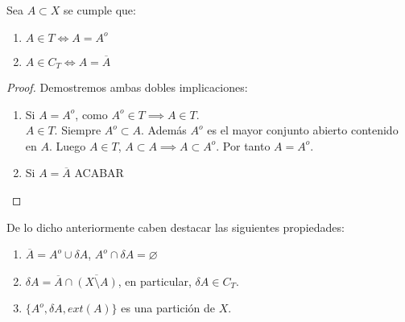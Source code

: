 \begin{ncor}
  Sea $A \subset X$ se cumple que:
  \begin{enumerate}
    \item $A \in T \Leftrightarrow A=A^o$
    \item $A \in C_T \Leftrightarrow A=\overline{A}$
  \end{enumerate}
\end{ncor}
\begin{proof}
  Demostremos ambas dobles implicaciones:
  \begin{enumerate}
    \item \fbox{$\Leftarrow$} Si $A=A^o$, como $A^o \in T \implies A \in T$. \\ \fbox{$\Rightarrow$} $A \in T$. Siempre $A^o \subset A$. Además $A^o$ es el mayor conjunto abierto contenido en $A$. Luego $A \in T$, $A \subset A \implies A \subset A^o$. Por tanto $A=A^o$.
    \item \fbox{$\Leftarrow$} Si $A=\overline{A}$ ACABAR
  \end{enumerate}
\end{proof}

\begin{properties}
  De lo dicho anteriormente caben destacar las siguientes propiedades:
  \begin{enumerate}
    \item $\overline{A}=A^o \cup \delta A$, $A^o \cap \delta A = \varnothing$
    \item $\delta A = \overline{A} \cap \overline{(X \setminus A)}$, en particular, $\delta A \in C_T$.
    \item $\{A^o,\delta A, ext(A)\}$ es una partición de $X$.
  \end{enumerate}
\end{properties}

